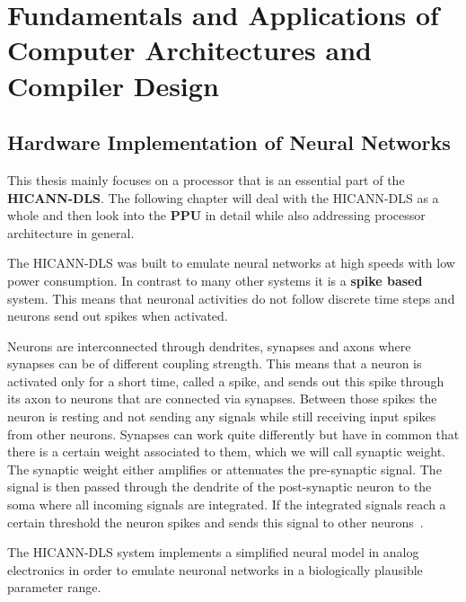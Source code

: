 \chapter{Fundamentals and Applications of Computer Architectures and Compiler Design}
\label{ch:methods}

\section{Hardware Implementation of Neural Networks}
This thesis mainly focuses on a processor that is an essential part of the \textbf{\ac{HICANN-DLS}}.
The following chapter will deal with the \ac{HICANN-DLS} as a whole and then look into the \textbf{\ac{PPU}} in detail while also addressing processor architecture in general.

The \ac{HICANN-DLS} was built to emulate neural networks at high speeds with low power consumption.
In contrast to many other systems  it is a \textbf{spike based} system.
This means that neuronal activities do not follow discrete time steps and neurons send out spikes when activated.

Neurons are interconnected through dendrites, synapses and axons where synapses can be of different coupling strength. 
This means that a neuron is activated only for a short time, called a spike, and sends out this spike through its axon to neurons that are connected via synapses.
Between those spikes the neuron is resting and not sending any signals while still receiving input spikes from other neurons.
Synapses can work quite differently but have in common that there is a certain weight associated to them, which we will call synaptic weight.
The synaptic weight either amplifies or attenuates the pre-synaptic signal.
The signal is then passed through the dendrite of the post-synaptic neuron to the soma where all incoming signals are integrated.
If the integrated signals reach a certain threshold the neuron spikes and sends this signal to other neurons~\citep{silbernagl2009color}.

The \ac{HICANN-DLS} system implements a simplified neural model in analog electronics in order to emulate neuronal networks in a biologically plausible parameter range.

